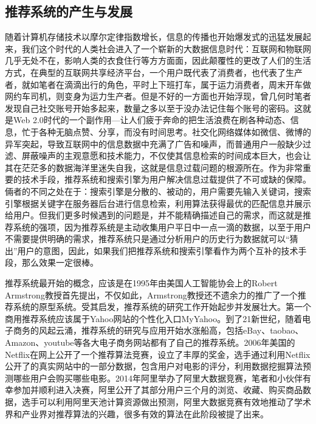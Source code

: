 	\subsection{推荐系统的产生与发展}
	随着计算机存储技术以摩尔定律指数增长，信息的传播也开始爆发式的迅猛发展起来，我们这个时代的人类社会进入了一个崭新的大数据信息时代：互联网和物联网几乎无处不在，影响人类的衣食住行等方方面面，因此颠覆性的更改了人们的生活方式，在典型的互联网共享经济平台，一个用户既代表了消费者，也代表了生产者，就如笔者在滴滴出行的角色，平时上下班打车，属于运力消费者，周末开车做网约车司机，则变身为运力生产者。但是不好的一方面也开始浮现，曾几何时笔者发现自己社交账号开始多起来，数量之多以至于没办法记住每个账号的密码。这就是Web 2.0时代的一个副作用---让人们疲于奔命的把生活浪费在刷各种动态、信息，忙于各种无脑点赞、分享，而没有时间思考。社交化网络媒体如微信、微博的异军突起，导致互联网中的信息数据中充满了广告和噪声，而普通用户一般缺少过滤、屏蔽噪声的主观意愿和技术能力，不仅使其信息检索的时间成本巨大，也会让其在茫茫多的数据海洋里迷失自我，这就是信息过载问题的根源所在\citep{info-overload, info-overload:1}。作为非常重要的技术手段，推荐系统和搜索引擎为用户解决信息过载提供了不可或缺的保障。倆者的不同之处在于：搜索引擎是分散的、被动的，用户需要先输入关键词，搜索引擎根据关键字在服务器后台进行信息检索，利用算法获得最优的匹配信息并展示给用户。但我们更多时候遇到的问题是，并不能精确描述自己的需求，而这就是推荐系统的强项，因为推荐系统是主动收集用户平日中一点一滴的数据，以至于用户不需要提供明确的需求，推荐系统只是通过分析用户的历史行为数据就可以“猜出”用户的意图，因此，如果我们把推荐系统和搜索引擎看作为两个互补的技术手段，那么效果一定很棒。

	推荐系统最开始的概念，应该是在1995年由美国人工智能协会\citep{recmd-history}上的Robert Armstrong教授首先提出，不仅如此，Armstrong教授还不遗余力的推广了一个推荐系统的原型系统。受其启发，推荐系统的研究工作开始起步并发展壮大。第一个商用推荐系统应该属于Yahoo网站的个性化入口MyYahoo。到了21新世纪，随着电子商务的风起云涌，推荐系统的研究与应用开始水涨船高，包括eBay、taobao、Amazon、youtube\citep{recmd-youtube}等各大电子商务网站都有了自己的推荐系统。2006年美国的Netflix\citep{recmd-netflix}在网上公开了一个推荐算法竞赛，设立了丰厚的奖金，选手通过利用Netflix公开了的真实网站中的一部分数据，包含用户对电影的评分，利用数据挖掘算法预测哪些用户会购买哪些电影。2014年阿里举办了阿里大数据竞赛，笔者和小伙伴有幸参加并顺利进入决赛，阿里公开了其部分用户三个月的浏览、收藏、购买商品数据，选手可以利用阿里天池计算资源做出预测，阿里大数据竞赛有效地推动了学术界和产业界对推荐算法的兴趣，很多有效的算法在此阶段被提了出来。

